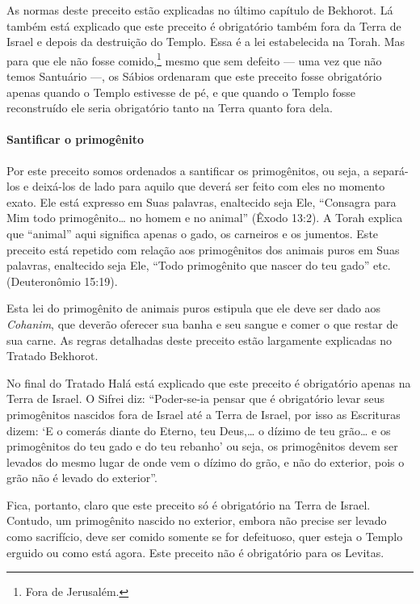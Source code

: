 As normas deste preceito estão explicadas no último capítulo de Bekhorot. Lá também está explicado que este preceito é obrigatório também
fora da Terra de Israel e depois da destruição do Templo. Essa é a lei
estabelecida na Torah. Mas para que ele não fosse comido,\footnote{Fora de Jerusalém.} mesmo
que sem defeito ---
uma vez que não temos Santuário ---, os Sábios ordenaram que este
preceito fosse obrigatório apenas quando o Templo estivesse de pé, e que quando o
Templo fosse reconstruído ele seria obrigatório tanto na Terra quanto
fora dela.

\paragraph{Santificar o primogênito}

Por este preceito somos ordenados a santificar os primogênitos, ou seja,
a separá-los e deixá-los de lado para aquilo que deverá ser feito com
eles no momento exato. Ele está expresso em Suas palavras, enaltecido
seja Ele, ``Consagra para Mim todo primogênito\ldots{} no homem e no
animal'' (Êxodo 13:2). A Torah explica que ``animal'' aqui significa
apenas o gado, os carneiros e os jumentos. Este preceito está repetido
com relação aos primogênitos dos animais puros em Suas palavras,
enaltecido seja Ele, ``Todo primogênito que nascer do teu gado'' etc.
(Deuteronômio 15:19).

Esta lei do primogênito de animais puros estipula que ele deve ser dado
aos \textit{Cohanim}, que deverão oferecer sua banha e seu sangue e comer
o que restar de sua carne. As regras detalhadas deste preceito estão
largamente explicadas no Tratado Bekhorot.

No final do Tratado Halá está explicado que este preceito é obrigatório
apenas na Terra de Israel. O Sifrei diz: ``Poder-se-ia pensar que é
obrigatório levar seus primogênitos nascidos fora de Israel até a Terra
de Israel, por isso as Escrituras dizem: `E o comerás diante do Eterno,
teu Deus,\ldots{} o dízimo de teu grão\ldots{} e os primogênitos do teu gado e do %
teu rebanho' ou seja, os primogênitos devem ser levados do mesmo lugar
de onde vem o dízimo do grão, e não do exterior, pois o grão não é
levado do exterior''.

Fica, portanto, claro que este preceito só é obrigatório na Terra de
Israel. Contudo, um primogênito nascido no exterior, embora não precise
ser levado como sacrifício, deve ser comido somente se for defeituoso,
quer esteja o Templo erguido ou como está agora. Este preceito não é
obrigatório para os Levitas.

